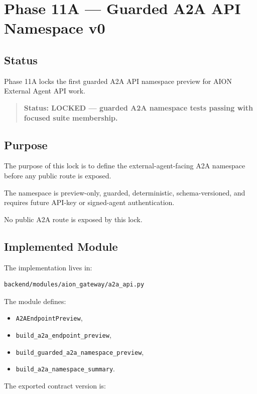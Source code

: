 \section{Phase 11A --- Guarded A2A API Namespace v0}
\label{sec:aion-guarded-a2a-api-namespace-v0}

\subsection{Status}

Phase 11A locks the first guarded A2A API namespace preview for AION External Agent API work.

\begin{quote}
\textbf{Status: LOCKED --- guarded A2A namespace tests passing with focused suite membership.}
\end{quote}

\subsection{Purpose}

The purpose of this lock is to define the external-agent-facing A2A namespace before any public route is exposed.

The namespace is preview-only, guarded, deterministic, schema-versioned, and requires future API-key or signed-agent authentication.

No public A2A route is exposed by this lock.

\subsection{Implemented Module}

The implementation lives in:

\begin{verbatim}
backend/modules/aion_gateway/a2a_api.py
\end{verbatim}

The module defines:

\begin{itemize}
  \item \texttt{A2AEndpointPreview},
  \item \texttt{build\_a2a\_endpoint\_preview},
  \item \texttt{build\_guarded\_a2a\_namespace\_preview},
  \item \texttt{build\_a2a\_namespace\_summary}.
\end{itemize}

The exported contract version is:

